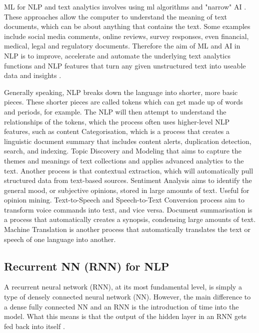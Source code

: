 \documentclass[a4paper,10pt]{article}
\begin{document}
	ML for NLP and text analytics involves using ml algorithms and "narrow" AI \cite{ml_nlp}. These approaches allow the computer to understand the meaning of text documents, which can be about anything that contains the text. Some examples include social media comments, online reviews, survey responses, even financial, medical, legal and regulatory documents. Therefore the aim of ML and AI in NLP is to improve, accelerate and automate the underlying text analytics functions and NLP features that turn any given unstructured text into useable data and insights \cite{ml_nlp}.
	
	Generally speaking, NLP breaks down the language into shorter, more basic pieces. These shorter pieces are called tokens which can get made up of words and periods, for example. The NLP will then attempt to understand the relationships of the tokens, which the process often uses higher-level NLP features, such as \cite{nlp_history} content Categorisation, which is a process that creates a linguistic document summary that includes content alerts, duplication detection, search, and indexing. Topic Discovery and Modeling that aims to capture the themes and meanings of text collections and applies advanced analytics to the text. Another process is that contextual extraction, which will automatically pull structured data from text-based sources. Sentiment Analysis aims to identify the general mood, or subjective opinions, stored in large amounts of text. Useful for opinion mining. Text-to-Speech and Speech-to-Text Conversion process aim to transform voice commands into text, and vice versa. Document summarisation is a process that automatically creates a synopsis, condensing large amounts of text. Machine Translation is another process that automatically translates the text or speech of one language into another.



\subsection{Recurrent NN (RNN) for NLP}

	A recurrent neural network (RNN), at its most fundamental level, is simply a type of densely connected neural network (NN). However, the main difference to a dense fully connected NN and an RNN is the introduction of time into the model. What this means is that the output of the hidden layer in an RNN gets fed back into itself \cite{adv_in_ml, geron2019hands}.
	
\end{document}
